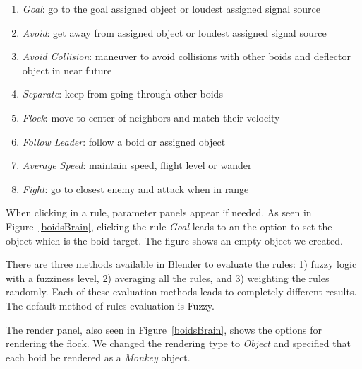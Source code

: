 \begin{enumerate}
\item{\textit{Goal}: go to the goal assigned object or loudest assigned signal source}
\item{\textit{Avoid}: get away from assigned object or loudest assigned signal source}
\item{\textit{Avoid Collision}: maneuver to avoid collisions with other boids and deflector object in near future}
\item{\textit{Separate}: keep from going through other boids}
\item{\textit{Flock}: move to center of neighbors and match their velocity}
\item{\textit{Follow Leader}: follow a boid or assigned object}
\item{\textit{Average Speed}: maintain speed, flight level or wander}
\item{\textit{Fight}: go to closest enemy and attack when in range}
\end{enumerate}

When clicking in a rule, parameter panels appear if needed. As seen in Figure~\ref{boidsBrain}, clicking the rule \textit{Goal} leads to an the option to set the object which is the boid target. The figure shows an empty object we created. 

There are three methods available in Blender to evaluate the rules: 1) fuzzy logic with a fuzziness level, 2) averaging all the rules, and 3) weighting the rules randomly. Each of these evaluation methods leads to completely different results. The default method of rules evaluation is Fuzzy.

The render panel, also seen in Figure~\ref{boidsBrain}, shows the options for rendering the flock. We changed the rendering type to \textit{Object} and specified that each boid be rendered as a \textit{Monkey} object.

